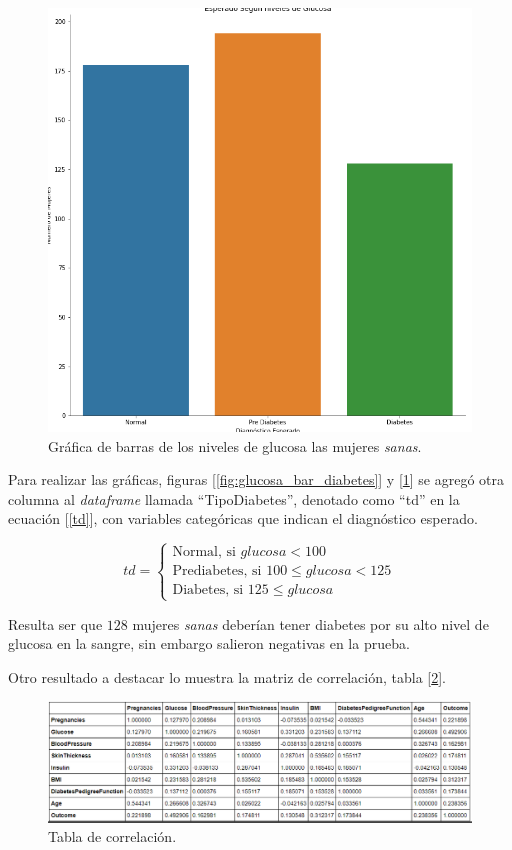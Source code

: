 \documentclass{article}
\begin{document}
\begin{figure}[H]
	\centering
	\includegraphics[width=0.65\linewidth]{glucosa_bar_sanas.png}
	\caption{Gráfica de barras de los niveles de glucosa las mujeres \emph{sanas}.}%
	\label{fig:glucosa_bar_sanas}
\end{figure}

Para realizar las gráficas, figuras [\ref{fig:glucosa_bar_diabetes}] y [\ref{fig:glucosa_bar_sanas}] se agregó otra columna al \emph{dataframe} llamada ``TipoDiabetes'', denotado como ``td'' en la ecuación [\ref{td}], con variables categóricas que indican el diagnóstico esperado.

\begin{equation}\label{td}
	td=
	\begin{cases}
		\text{Normal, si      } glucosa < 100\\
		\text{Prediabetes, si   } 100 \leq glucosa < 125\\
		\text{Diabetes, si  } 125 \leq glucosa
	\end{cases}
\end{equation}

Resulta ser que $128$ mujeres \emph{sanas} deberían tener diabetes por su alto nivel de glucosa en la sangre, sin embargo salieron negativas en la prueba.

Otro resultado a destacar lo muestra la matriz de correlación, tabla [\ref{fig:corr}].

\begin{figure}[H]
	\centering
	\includegraphics[width=0.9\linewidth]{corr.png}
	\caption{Tabla de correlación.}%
	\label{fig:corr}
\end{figure}
\end{document}
